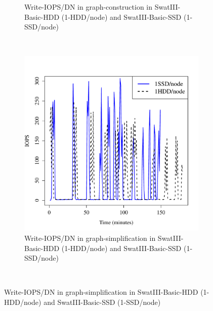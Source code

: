 \documentclass[conference]{IEEEtran}
\begin{document}
\begin{figure}[htb]
\begin{subfigure}[b]{0.23\textwidth}
                \caption{Write-IOPS/DN in graph-construction in SwatIII-Basic-HDD (1-HDD/node) and SwatIII-Basic-SSD (1-SSD/node)}
                \label{fig:BGHddSsdWrIops}
        \end{subfigure}
        ~ %
        \begin{subfigure}[b]{0.23\textwidth}
                \includegraphics[width=\textwidth]{Figure/SystemData/Plots/ECHddSsdWrIops.pdf}
                \caption{Write-IOPS/DN in graph-simplification in SwatIII-Basic-HDD (1-HDD/node) and SwatIII-Basic-SSD (1-SSD/node)}
                \label{fig:ECHddSsdWrIops}
        \end{subfigure}
        ~ %

\end{figure}
\end{document}
